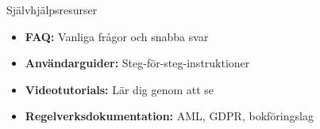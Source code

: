 \documentclass[10pt]{beamer}
\begin{document}
\begin{frame}[fragile]
  \vspace{0.3cm}

  \begin{block}{Självhjälpsresurser}
    \footnotesize
    \begin{itemize}
      \item \textbf{FAQ:} Vanliga frågor och snabba svar
      \item \textbf{Användarguider:} Steg-för-steg-instruktioner
      \item \textbf{Videotutorials:} Lär dig genom att se
      \item \textbf{Regelverksdokumentation:} AML, GDPR, bokföringslag
    \end{itemize}
  \end{block}

  \vspace{0.5cm}
  \begin{flushright}
  \end{flushright}

\end{frame}


\end{document}
